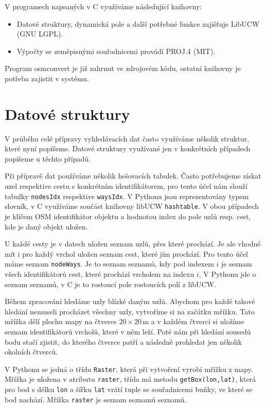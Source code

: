 \noindent V programech napsaných v C využíváme následující knihovny:
\begin{itemize}
	\item Datové struktury, dynamická pole a další potřebné funkce zajišťuje
	{\tuc LibUCW} (GNU LGPL).
	\item Výpočty se zeměpisnými souřadnicemi provádí {\tuc PROJ.4}
	(MIT).
\end{itemize}

Program osmconvert je již zahrnut ve zdrojovém kódu, ostatní knihovny je potřeba
zajistit v systému.

\section{Datové struktury}
V průběhu celé přípravy vyhledávacích dat často využíváme několik struktur,
které nyní popíšeme. Datové struktury využívané jen v konkrétních případech
popíšeme u těchto případů.

Při přípravě dat používáme několik {\tuc hešovacích tabulek}. Často potřebujeme
získat uzel respektive cestu s konkrétním identifikátorem, pro tento účel nám
slouží tabulky \verb|nodesIdx| respektive \verb|waysIdx|. V Pythonu jsou
reprezentovány typem slovník, v C využíváme součást knihovny libUCW
\verb|hashtable|. V obou případech je klíčem OSM identifikátor objektu a
hodnotou index do pole uzlů resp. cest, kde je daný objekt uložen.

U každé cesty je v datech uložen seznam uzlů, přes které prochází. Je ale vhodné
mít i pro každý vrchol uložen seznam cest, které jím prochází. Pro tento účel
máme seznam \verb|nodeWays|. Je to seznam seznamů, kdy pod indexem $i$ je seznam
všech identifikátorů cest, které prochází vrcholem na indexu $i$. V Pythonu jde
o seznam seznamů, v C je to rostoucí pole rostoucích polí z libUCW.

Během zpracování hledáme uzly blízké daným uzlů. Abychom pro každé takové
hledání nemuseli procházet všechny uzly, vytvoříme si na začátku {\tuc mřížku}.
Tato mřížka dělí plochu mapy na čtverce $20 \times 20$\,m a v každém čtverci si
uložíme seznam identifikátorů vrcholů, které v něm leží. Poté nám při hledání
sousedů bodu stačí zjistit, do kterého čtverce patří a následně prohledat jen
několik okolních čtverců.

V Pythonu se jedná o třídu \verb|Raster|, která při vytvoření vyrobí mřížku z
mapy. Mřížka je uložena v atributu \verb|raster|, třída má metodu
\verb|getBox(lon,lat)|, která pro bod s  délku \verb|lon| a šířku \verb|lat|
vrátí tuple se souřadnicemi buňky, ve které se bod nachází. Mřížka \verb|raster|
je seznam seznamů seznamů.

